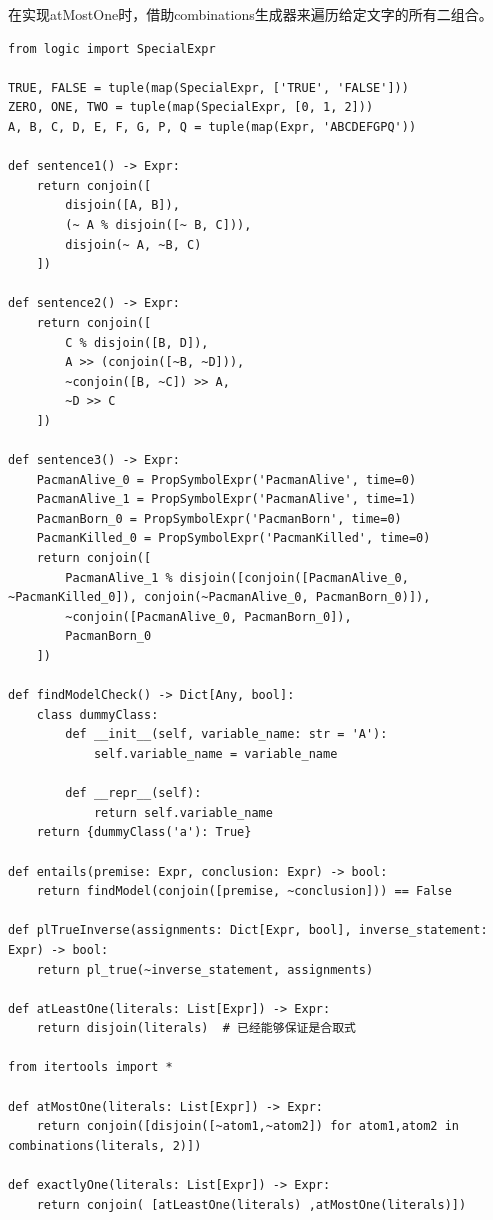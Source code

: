 在实现atMostOne时，借助combinations生成器来遍历给定文字的所有二组合。
%
%
\begin{lstlisting}[emph={[3]sentence,premise,conclusion,assignments,inverse,statement,literals},emphstyle={[3]\color{vscode_parametercolor}},emph={[4]dummyClass,Expr,Dict,List},emphstyle={[4]\color{vscode_classcolor}}]
from logic import SpecialExpr

TRUE, FALSE = tuple(map(SpecialExpr, ['TRUE', 'FALSE']))
ZERO, ONE, TWO = tuple(map(SpecialExpr, [0, 1, 2]))
A, B, C, D, E, F, G, P, Q = tuple(map(Expr, 'ABCDEFGPQ'))
    
def sentence1() -> Expr:
    return conjoin([
        disjoin([A, B]),
        (~ A % disjoin([~ B, C])),
        disjoin(~ A, ~B, C)
    ])

def sentence2() -> Expr:
    return conjoin([
        C % disjoin([B, D]),
        A >> (conjoin([~B, ~D])),
        ~conjoin([B, ~C]) >> A,
        ~D >> C
    ])

def sentence3() -> Expr:
    PacmanAlive_0 = PropSymbolExpr('PacmanAlive', time=0)
    PacmanAlive_1 = PropSymbolExpr('PacmanAlive', time=1)
    PacmanBorn_0 = PropSymbolExpr('PacmanBorn', time=0)
    PacmanKilled_0 = PropSymbolExpr('PacmanKilled', time=0)
    return conjoin([
        PacmanAlive_1 % disjoin([conjoin([PacmanAlive_0, ~PacmanKilled_0]), conjoin(~PacmanAlive_0, PacmanBorn_0)]),
        ~conjoin([PacmanAlive_0, PacmanBorn_0]),
        PacmanBorn_0
    ])

def findModelCheck() -> Dict[Any, bool]:
    class dummyClass:
        def __init__(self, variable_name: str = 'A'):
            self.variable_name = variable_name

        def __repr__(self):
            return self.variable_name
    return {dummyClass('a'): True}

def entails(premise: Expr, conclusion: Expr) -> bool:
    return findModel(conjoin([premise, ~conclusion])) == False

def plTrueInverse(assignments: Dict[Expr, bool], inverse_statement: Expr) -> bool:
    return pl_true(~inverse_statement, assignments)

def atLeastOne(literals: List[Expr]) -> Expr:
    return disjoin(literals)  # 已经能够保证是合取式

from itertools import *

def atMostOne(literals: List[Expr]) -> Expr:
    return conjoin([disjoin([~atom1,~atom2]) for atom1,atom2 in combinations(literals, 2)])

def exactlyOne(literals: List[Expr]) -> Expr:
    return conjoin( [atLeastOne(literals) ,atMostOne(literals)])
\end{lstlisting}
